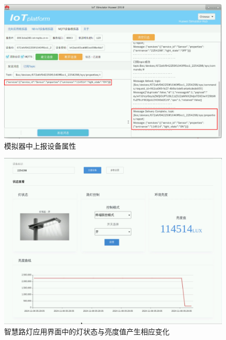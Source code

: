\begin{figure}[!htbp]
\centering
\includegraphics[width=\textwidth]{figures/序列 01.00_23_37_48.Still018.png}
\caption{模拟器中上报设备属性}\label{模拟器中上报设备属性}
\end{figure}

\begin{figure}[!htbp]
\centering
\includegraphics[width=\textwidth]{figures/序列 01.00_23_49_54.Still019.png}
\caption{智慧路灯应用界面中的灯状态与亮度值产生相应变化}\label{智慧路灯应用界面中的灯状态与亮度值产生相应变化}
\end{figure}

